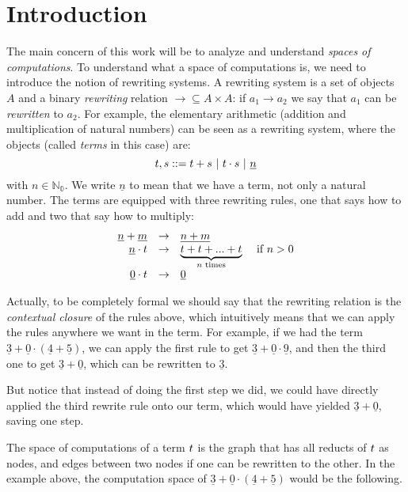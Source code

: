 \chapter{Introduction}

The main concern of this work will be to analyze and understand \emph{spaces of computations}.
To understand what a space of computations is, we need to introduce the notion of rewriting systems.
A rewriting system is a set of objects $A$ and a binary \emph{rewriting} relation
$\to \subseteq A \times A$: if $a_1 \to a_2$ we say that $a_1$ can be \emph{rewritten} to $a_2$.
For example, the elementary arithmetic (addition and multiplication of natural numbers)
can be seen as a rewriting system, where the objects (called \emph{terms} in this case) are:
\[
  t, s ::= t + s \ |\ t \cdot s \ |\ \underline{n}
\]
\noindent with $n \in \mathbb{N_0}$. We write $\underline{n}$ to mean that we have a term,
not only a natural number.
The terms are equipped with three rewriting rules,
one that says how to add and two that say how to multiply:
\[
\begin{array}{rclc}
  \underline{n} + \underline{m} & \to & \underline{n + m} & \\
  \underline{n} \cdot t       & \to & \underbrace{t + t + ... + t}_{n \text{ times}} & \text{ if } n > 0 \\
  \underline{0} \cdot t       & \to & \underline{0} &
\end{array}
\]

Actually, to be completely formal we should say that the rewriting relation is the \emph{contextual closure}
of the rules above, which intuitively means that we can apply the rules anywhere we want in the term.
For example, if we had the term $\underline{3} + \underline{0} \cdot (\underline{4} + \underline{5})$,
we can apply the first rule to get $\underline{3} + \underline{0} \cdot \underline{9}$,
and then the third one to get $\underline{3} + \underline{0}$, which can be rewritten to $\underline{3}$.

But notice that instead of doing the first step we did, we could have directly applied the third rewrite rule
onto our term, which would have yielded $\underline{3} + \underline{0}$, saving one step.

The space of computations of a term $t$ is the graph that has all reducts of $t$ as nodes,
and edges between two nodes if one can be rewritten to the other.
In the example above, the computation space of $\underline{3} + \underline{0} \cdot (\underline{4} + \underline{5})$
would be the following.

